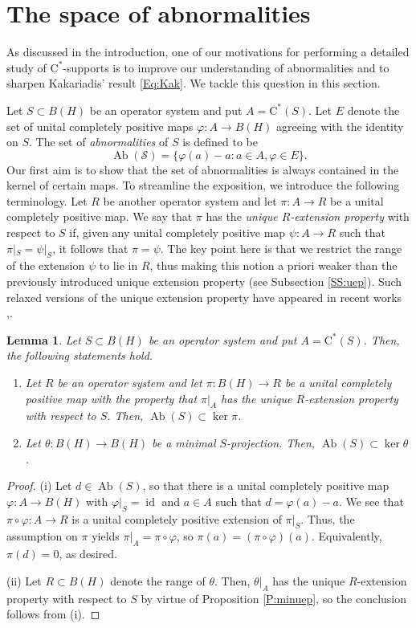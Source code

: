 \documentclass[10pt]{amsart}
\renewcommand{\S}{{\mathcal{S}}}
\newcommand{\rC}{\mathrm{C}}
\renewcommand{\phi}{\varphi}
\newcommand{\Ab}{\operatorname{Ab}}
\newcommand{\id}{\operatorname{id}}
\newtheorem{lemma}{Lemma}[section]
\theoremstyle{definition}
\begin{document}
\section{The space of abnormalities}\label{S:ab}
As discussed in the introduction, one of our motivations for performing a detailed study of $\rC^*$-supports is to improve our understanding of abnormalities and to sharpen Kakariadis' result \eqref{Eq:Kak}. We tackle this question in this section.


Let $S\subset B(H)$ be an operator system and put $A=\rC^*(S)$. Let $E$ denote the set of unital completely positive maps $\phi:A\to B(H)$ agreeing with the identity on $S$. The set of  \emph{abnormalities} of $S$ is defined to be
\[
\Ab(\S)=\{\phi(a)-a:a\in A, \phi\in E\}.
\]
Our first aim is to show that the set of abnormalities is always contained in the kernel of certain maps. To streamline the exposition, we introduce the following terminology.
Let $R$ be another operator system and let $\pi:A\to R$ be a unital completely positive map. We say that $\pi$ has the \emph{unique $R$-extension property} with respect to $S$ if, given any unital completely positive map $\psi:A\to R$ such that $\pi|_S=\psi|_S$, it follows that $\pi=\psi$. The key point here is that we restrict the range of the extension $\psi$ to lie in $R$, thus making this notion a priori weaker than the previously introduced unique extension property (see Subsection \ref{SS:uep}). Such relaxed versions of the unique extension property have appeared in recent works \cite{CTh2024},\cite{DT2025}.

\begin{lemma}\label{L:abker}
Let $S\subset B(H)$ be an operator system and put $A=\rC^*(S)$. Then, the following statements hold.
\begin{enumerate}[{\rm(i)}]
\item Let $R$ be an operator system and let $\pi:B(H)\to R$ be a unital completely positive map with the property that $\pi|_{A}$ has the unique $R$-extension property with respect to $S$. Then, $\Ab(S)\subset \ker \pi$.
\item Let $\theta:B(H)\to B(H)$ be a minimal $S$-projection. Then, $\Ab(S)\subset \ker \theta$.
\end{enumerate}
\end{lemma}
\begin{proof}
(i) Let $d\in \Ab(S)$, so that there is a unital completely positive map $\phi:A\to B(H)$ with $\phi|_S=\id$  and $a\in A$ such that $d=\phi(a)-a$. We see that $\pi\circ \phi:A\to R$ is a unital completely positive extension of $\pi|_{S}$. Thus, the assumption on $\pi$ yields $\pi|_{A}=\pi\circ \phi$, so $\pi(a)=(\pi\circ \phi)(a)$. Equivalently, $\pi(d)=0$, as desired.

(ii) Let $R\subset B(H)$ denote the range of $\theta$. Then, $\theta|_{A}$ has the unique $R$-extension property with respect to $S$ by virtue of  Proposition \ref{P:minuep}, so the conclusion follows from (i).
\end{proof}
\end{document}
